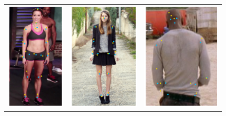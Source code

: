 \setlength{\tabcolsep}{1pt}
\begin{figure}[t!]
        \begin{tabular}{ccc}
        \includegraphics[height=.65\columnwidth]{resources/MotivativeAnnotation/MPII}
        &
        \includegraphics[height=.65\columnwidth]{resources/MotivativeAnnotation/FashionPose}
        &
        \includegraphics[trim=50 0 50 0,clip,height=.65\columnwidth]{resources/MotivativeAnnotation/FLIC}

\end{tabular}
\end{figure}
